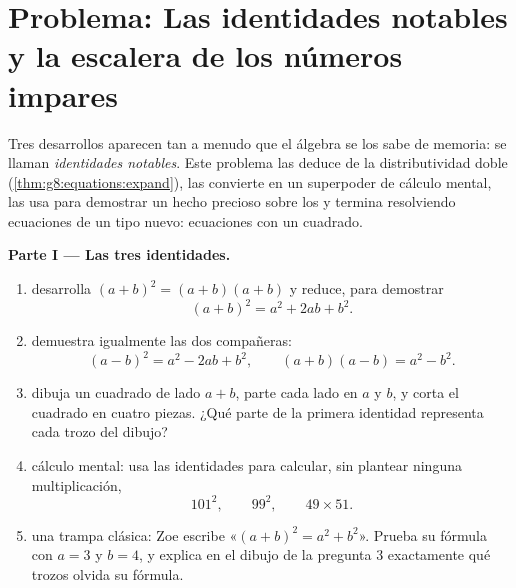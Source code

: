 \section{Problema: Las identidades notables y la escalera de los números
impares}

\begin{problem}[{Problema de fin de semana --- $(a+b)^2$, $(a-b)^2$,
$(a+b)(a-b)$ y la suma $1 + 3 + 5 + \dots + (2n-1) = n^2$}]
\label{pb:g8:equations:1}
Tres desarrollos aparecen tan a menudo que el álgebra se los sabe de
memoria: se llaman \emph{identidades notables}. Este
problema las deduce de la distributividad doble
(\cref{thm:g8:equations:expand}), las convierte en un superpoder de cálculo mental,
las usa para demostrar un hecho precioso sobre los 
y termina resolviendo ecuaciones de un tipo nuevo: ecuaciones con un
cuadrado.

\medskip
\noindent\textbf{Parte I --- Las tres identidades.}
\begin{enumerate}
  \item desarrolla $(a + b)^2 = (a + b)(a + b)$ y reduce, para demostrar
        \[
        (a + b)^2 = a^2 + 2ab + b^2 .
        \]
  \item demuestra igualmente las dos compañeras:
        \[
        (a - b)^2 = a^2 - 2ab + b^2,
        \qquad
        (a + b)(a - b) = a^2 - b^2 .
        \]
  \item dibuja un cuadrado de lado $a + b$, parte cada lado en $a$
        y $b$, y corta el cuadrado en cuatro piezas. ¿Qué parte
        de la primera identidad representa cada trozo del
        dibujo?
  \item cálculo mental: usa las identidades para calcular, sin
        plantear ninguna multiplicación,
        \[
        101^2, \qquad 99^2, \qquad 49 \times 51 .
        \]
  \item una trampa clásica: Zoe escribe «$(a + b)^2 = a^2 + b^2$».
        Prueba su fórmula con $a = 3$ y $b = 4$, y explica en el
        dibujo de la pregunta 3 exactamente qué trozos olvida
        su fórmula.
\end{enumerate}


\end{problem}
